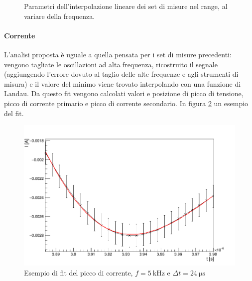\begin{figure}
\centering
{}
\caption{Parametri dell'interpolazione lineare dei set di misure nel range, al variare della frequenza.}
\label{fig:fitlin}
\end{figure}

\paragraph{Corrente}L'analisi proposta è uguale a quella pensata per i set di misure precedenti: vengono tagliate le oscillazioni ad alta frequenza, ricostruito il segnale (aggiungendo l'errore dovuto al taglio delle alte frequenze e agli strumenti di misura) e il valore del minimo viene trovato interpolando con una funzione di Landau. Da questo fit vengono calcolati valori e posizione di picco di tensione, picco di corrente primario e picco di corrente secondario.
In figura \ref{fig:landau} un esempio del fit.

\begin{figure}
\centering
\includegraphics[width=.6\textwidth]{Immagini/es_fit_landau.png}
\caption{Esempio di fit del picco di corrente, $f = \SI{5}{\kilo\hertz}$ e $\Delta t = \SI{24}{\micro\second}$}
\label{fig:landau}
\end{figure}

